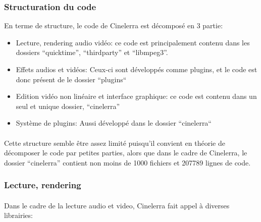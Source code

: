 \subsubsection {Structuration du code}

En terme de structure, le code de Cinelerra est décomposé en 3 partie:

\begin{itemize}

  \item{Lecture, rendering  audio vidéo: ce code est principalement
    contenu dans les dossiers ``quicktime'', ``thirdparty'' et
    ``libmpeg3''.}

  \item{Effets audios et vidéos: Ceux-ci sont développés comme plugins,
    et le code est donc présent de le dossier ``plugins`` }

  \item{Edition vidéo non linéaire et interface graphique: ce code est
    contenu dans un seul et unique dossier, ``cinelerra''}

  \item{Système de plugins: Aussi développé dans le dossier
  ``cinelerra``}

\end{itemize}

\paragraph{}

Cette structure semble être assez limité puisqu'il convient en théorie
de décomposer le code par petites parties, alors que dans le cadre de
Cinelerra, le dossier ``cinelerra'' contient non  moins de 1000 fichiers
et 207789 lignes de code.

\subsubsection{Lecture, rendering}

\paragraph{}

Dans le cadre de la lecture audio et video, Cinelerra fait appel à
diverses librairies:

